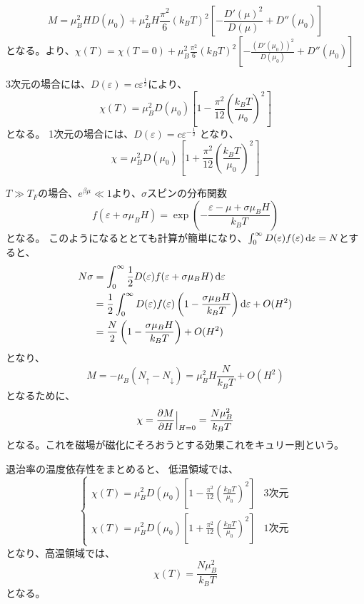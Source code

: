 \documentclass[titlepage]{ltjsarticle}
\begin{document}
\begin{equation}
  M = \mu_B^2 H D(\mu_0) + \mu_B^2 H \frac{\pi^2}{6}(k_BT)^2 \left[ - \frac{D'(\mu)^2}{D(\mu)} + D''(\mu_0) \right]
\end{equation}
となる。より、\(\chi(T)=\chi(T=0) + \mu_B^2 \frac{\pi^2}{6}(k_BT)^2 \left[ - \frac{(D'(\mu_0))^2}{D(\mu_0)} + D''(\mu_0) \right] \)



3次元の場合には、\(D(\varepsilon)=c \varepsilon^{\frac{1}{2}}\)により、
\begin{equation}
  \chi(T) = \mu_B^2 D(\mu_0) \left[ 1 - \frac{\pi^2}{12}\left( \frac{k_BT }{\mu_0} \right)^2 \right]
\end{equation}
となる。
1次元の場合には、\(D(\varepsilon)=c \varepsilon^{-\frac{1}{2}}\)
となり、
\begin{equation}
  \chi = \mu_B^2 D(\mu_0) \left[ 1 + \frac{\pi^2}{12}\left( \frac{k_BT}{\mu_0} \right)^2 \right]
\end{equation}

\(T \gg T_F\)の場合、\(e^{\beta \mu}\ll 1\)より、\(\sigma\)スピンの分布関数
\begin{equation}
  f(\varepsilon+\sigma \mu_B H) = \exp\left( - \frac{\varepsilon-\mu + \sigma \mu_B H}{k_BT} \right)
\end{equation}
となる。
このようになるととても計算が簡単になり、\(\int_{0}^{\infty}D(\varepsilon)f(\varepsilon)\odif{\varepsilon}=N\)とすると、
\begin{align}
  N \sigma & = \int_{0}^{\infty} \frac{1}{2}D(\varepsilon) f(\varepsilon + \sigma \mu_B H) \odif{\varepsilon}\\
  & = \frac{1}{2}\int_{0}^{\infty}D(\varepsilon) f(\varepsilon) \left( 1 - \frac{\sigma \mu_B H}{k_BT} \right)\odif{\varepsilon} + O(H^2)\\
  & = \frac{N}{2}\left( 1 - \frac{\sigma \mu_B H}{k_BT} \right) + O(H^2)
\end{align}
となり、
\begin{equation}
  M = - \mu_B(N_{\uparrow} - N_{\downarrow}) =  \mu_B^2 H \frac{N}{k_BT} + O(H^2)
\end{equation}
となるために、
\begin{equation}
  \chi = \pdv{M}{H}\Big|_{H=0} =\frac{N\mu_B^2}{k_BT}
\end{equation}
となる。これを磁場が磁化にそろおうとする効果これをキュリー則という。

退治率の温度依存性をまとめると、
低温領域では、
\begin{equation}
  \begin{cases}
    \chi(T) = \mu_B^2 D(\mu_0) \left[ 1 - \frac{\pi^2}{12}\left( \frac{k_BT}{\mu_0} \right)^2 \right] & \text{3次元} \\
    \chi(T) = \mu_B^2 D(\mu_0) \left[ 1 + \frac{\pi^2}{12}\left( \frac{k_BT}{\mu_0} \right)^2 \right] & \text{1次元}
  \end{cases}
\end{equation}
となり、高温領域では、
\begin{equation}
  \chi(T) = \frac{N\mu_B^2}{k_BT}
\end{equation}
となる。
\end{document}
